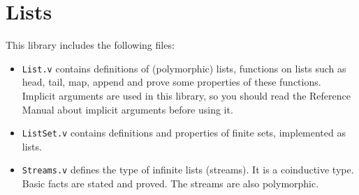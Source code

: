 \section{Lists}\label{Lists}

This library includes the following files:

\begin{itemize}

\item {\tt List.v} contains definitions of (polymorphic) lists, 
  functions on lists such as head, tail, map, append and prove some
  properties of these functions. Implicit arguments are used in this
  library, so you should read the Reference Manual about implicit
  arguments before using it.

\item {\tt ListSet.v} contains definitions and properties of finite
  sets, implemented as lists.

\item {\tt Streams.v} defines the type of infinite lists (streams). It is a
  coinductive type. Basic facts are stated and proved. The streams are
  also polymorphic.

\end{itemize}

